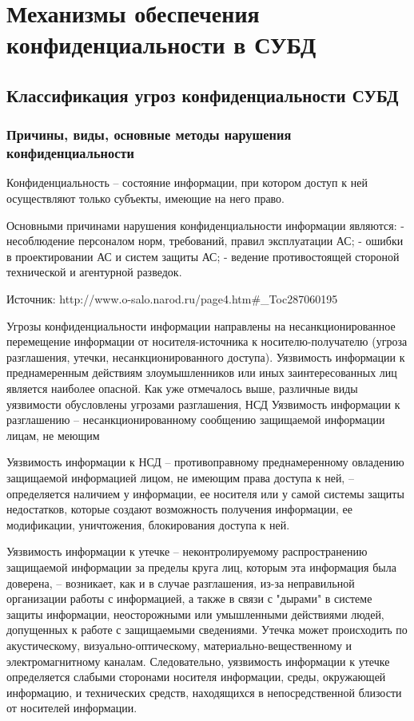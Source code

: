 \section{Механизмы обеспечения конфиденциальности в СУБД}
\subsection{Классификация угроз конфиденциальности СУБД}

\subsubsection{Причины, виды, основные методы нарушения конфиденциальности}

Конфиденциальность – состояние информации, при котором доступ к ней осуществляют только субъекты, имеющие на него право.

Основными причинами нарушения конфиденциальности информации являются:
-     несоблюдение персоналом норм, требований, правил эксплуатации АС;
-     ошибки в проектировании АС и систем защиты АС;
-     ведение противостоящей стороной технической и агентурной разведок.


Источник: http://www.o-salo.narod.ru/page4.htm\#\_Toc287060195

Угрозы конфиденциальности информации направлены на несанкционированное перемещение информации от носителя-источника к носителю-получателю (угроза разглашения, утечки, несанкционированного доступа).
Уязвимость информации к преднамеренным действиям злоумышленников или иных заинтересованных лиц является наиболее опасной. Как уже отмечалось выше, различные виды уязвимости обусловлены угрозами разглашения, НСД %
Уязвимость информации к разглашению – несанкционированному сообщению защищаемой информации лицам, не меющим %

Уязвимость информации к НСД – противоправному преднамеренному овладению защищаемой информацией лицом, не имеющим права доступа к ней, – определяется наличием у информации, ее носителя или у самой системы защиты недостатков, которые создают возможность получения информации, ее модификации, уничтожения, блокирования доступа к ней.

Уязвимость информации к утечке – неконтролируемому распространению защищаемой информации за пределы круга лиц, которым эта информация была доверена, – возникает, как и в случае разглашения, из-за неправильной организации работы с информацией, а также в связи с "дырами" в системе защиты информации, неосторожными или умышленными действиями людей, допущенных к работе с защищаемыми сведениями. Утечка может происходить по акустическому, визуально-оптическому, материально-вещественному и электромагнитному каналам. Следовательно, уязвимость информации к утечке определяется слабыми сторонами носителя информации, среды, окружающей информацию, и технических средств, находящихся в непосредственной близости от носителей информации.

